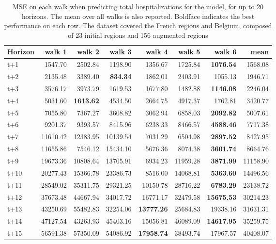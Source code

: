 \begin{table}[H]
\centering
\caption{MSE on each walk when predicting total hospitalizations for the model, for up to 20 horizons. The mean over all walks is also reported. Boldface indicates the best performance on each row. The dataset covered the French regions and Belgium, composed of 23 initial regions and 156 augmented regions }
\label{tab:MSE_walk_dense_model}
\begin{tabular}{lrrrrrrr}
\toprule
Horizon &    walk 1 &    walk 2 &   walk 3 &   walk 4 &   walk 5 &   walk 6 &     mean \\
\midrule
t+1  & 1547.70  & 2502.84  & 1198.90  & 1356.67  & 1725.84  & \textbf{1076.54}  & 1568.08  \\
t+2  & 2135.48  & 3389.40  & \textbf{834.34}  & 1862.01  & 2403.91  & 1055.13  & 1946.71  \\
t+3  & 3576.17  & 3973.79  & 1619.53  & 1677.80  & 1482.88  & \textbf{1146.08}  & 2246.04  \\
t+4  & 5031.60  & \textbf{1613.62}  & 4534.50  & 2664.75  & 4917.37  & 1762.81  & 3420.77  \\
t+5  & 7055.80  & 7367.27  & 3608.82  & 3062.94  & 6858.03  & \textbf{2092.82}  & 5007.61  \\
t+6  & 9201.37  & 9393.57  & 8415.96  & 6238.33  & 8466.57  & \textbf{4588.46}  & 7717.38  \\
t+7  & 11610.42  & 12383.95  & 10139.54  & 7031.29  & 6504.98  & \textbf{2897.52}  & 8427.95  \\
t+8  & 11655.86  & 7546.12  & 15434.10  & 5676.36  & 8074.38  & \textbf{3601.74}  & 8664.76  \\
t+9  & 19673.36  & 10808.64  & 13705.91  & 6934.23  & 11959.28  & \textbf{3871.99}  & 11158.90  \\
t+10  & 20277.43  & 15366.78  & 23386.73  & 8516.00  & 14068.81  & \textbf{5363.60}  & 14496.56  \\
t+11  & 28549.02  & 35311.75  & 29321.25  & 10150.78  & 28716.22  & \textbf{6783.29}  & 23138.72  \\
t+12  & 37673.48  & 44667.94  & 34017.72  & 16771.17  & 32479.58  & \textbf{15675.53}  & 30214.23  \\
t+13  & 43250.69  & 55482.83  & 32254.06  & \textbf{13777.26}  & 25684.83  & 19338.16  & 31631.31  \\
t+14  & 47127.54  & 43263.93  & 45403.16  & 15056.81  & 46089.09  & \textbf{14617.95}  & 35259.75  \\
t+15  & 56591.38  & 57350.09  & 54086.92  & \textbf{17958.74}  & 38493.74  & 17967.57  & 40408.07  \\

\end{tabular}
\end{table}
